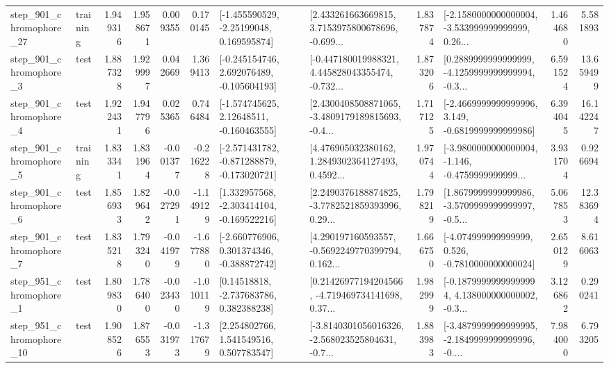 \begin{tabular}{llrrrrllrlrr}
  step\_901\_chromophore\_27 &  training &      1.949316 &    1.958671 &      0.009355 &  0.170145 &    [-1.455590529, -2.25199048, 0.169595874] &  [2.433261663669815, 3.7153975800678696, -0.699... &       1.837874 &  [-2.1580000000000004, -3.533999999999999, 0.26... &            1.464680 &          5.581893 \\
   step\_901\_chromophore\_3 &      test &      1.887328 &    1.929997 &      0.042669 &  1.369413 &   [-0.245154746, 2.692076489, -0.105604193] &  [-0.447180019988321, 4.445828043355474, -0.732... &       1.873206 &  [0.2889999999999999, -4.1259999999999994, -0.3... &            6.591524 &         13.659499 \\
   step\_901\_chromophore\_4 &      test &      1.922431 &    1.947796 &      0.025365 &  0.746484 &    [-1.574745625, 2.12648511, -0.160463555] &  [2.4300408508871065, -3.4809179189815693, -0.4... &       1.717125 &  [-2.4669999999999996, 3.149, -0.6819999999999986] &            6.394045 &         16.142247 \\
   step\_901\_chromophore\_5 &  training &      1.833341 &    1.831964 &     -0.001377 & -0.216228 &  [-2.571431782, -0.871288879, -0.173020721] &  [4.476905032380162, 1.2849302364127493, 0.4592... &       1.970744 &  [-3.9800000000000004, -1.146, -0.4759999999999... &            3.931704 &          0.926694 \\
   step\_901\_chromophore\_6 &      test &      1.856933 &    1.829642 &     -0.027291 & -1.149129 &   [1.332957568, -2.303414104, -0.169522216] &  [2.2490376188874825, -3.7782521859393996, 0.29... &       1.798219 &  [1.8679999999999986, -3.5709999999999997, -0.5... &            5.067853 &         12.383694 \\
   step\_901\_chromophore\_7 &      test &      1.835218 &    1.793240 &     -0.041979 & -1.677880 &   [-2.660776906, 0.301374346, -0.388872742] &  [4.290197160593557, -0.5692249770399794, 0.162... &       1.666750 &   [-4.074999999999999, 0.526, -0.7810000000000024] &            2.650129 &          8.616063 \\
   step\_951\_chromophore\_1 &      test &      1.809830 &    1.786400 &     -0.023430 & -1.010119 &     [0.14518818, -2.737683786, 0.382388238] &  [0.21426977194204566, -4.719469734141698, 0.37... &       1.982999 &  [-0.18799999999999994, 4.138000000000002, -0.3... &            3.126862 &          0.290241 \\
  step\_951\_chromophore\_10 &      test &      1.908526 &    1.876553 &     -0.031973 & -1.317679 &     [2.254802766, 1.541549516, 0.507783547] &  [-3.8140301056016326, -2.568023525804631, -0.7... &       1.883983 &  [-3.4879999999999995, -2.1849999999999996, -0.... &            7.984000 &          6.793205 \\

\end{tabular}
